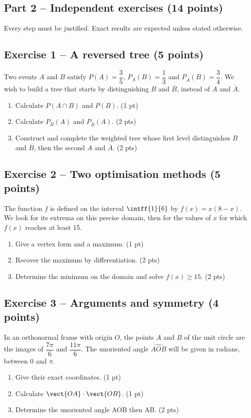 \mxnewpage\subsection*{Part 2 -- Independent exercises (14 points)}
Every step must be justified. Exact results are expected unless stated otherwise.
\subsection*{Exercise 1 -- A reversed tree (5 points)}
Two events $A$ and $B$ satisfy $P(A)=\dfrac35$, $P_A(B)=\dfrac13$ and $P_{\overline A}(B)=\dfrac34$. We wish to build a tree that starts by distinguishing $B$ and $\overline B$, instead of $A$ and $\overline A$.
\begin{enumerate}
\item Calculate $P(A\cap B)$ and $P(B)$. \hfill(1 pt)
\item Calculate $P_B(A)$ and $P_{\overline B}(A)$. \hfill(2 pts)
\item Construct and complete the weighted tree whose first level distinguishes $B$ and $\overline B$, then the second $A$ and $\overline A$. \hfill(2 pts)
\end{enumerate}
\subsection*{Exercise 2 -- Two optimisation methods (5 points)}
The function $f$ is defined on the interval $\intff{1}{6}$ by $f(x)=x(8-x)$. We look for its extrema on this precise domain, then for the values of $x$ for which $f(x)$ reaches at least 15.
\begin{enumerate}
\item Give a vertex form and a maximum. \hfill(1 pt)
\item Recover the maximum by differentiation. \hfill(2 pts)
\item Determine the minimum on the domain and solve $f(x)\geq15$. \hfill(2 pts)
\end{enumerate}
\subsection*{Exercise 3 -- Arguments and symmetry (4 points)}
In an orthonormal frame with origin $O$, the points $A$ and $B$ of the unit circle are the images of $\dfrac{7\pi}6$ and $\dfrac{11\pi}6$. The unoriented angle $\widehat{AOB}$ will be given in radians, between 0 and $\pi$.
\begin{enumerate}
\item Give their exact coordinates. \hfill(1 pt)
\item Calculate $\vect{OA}\cdot\vect{OB}$. \hfill(1 pt)
\item Determine the unoriented angle AOB then AB. \hfill(2 pts)
\end{enumerate}
